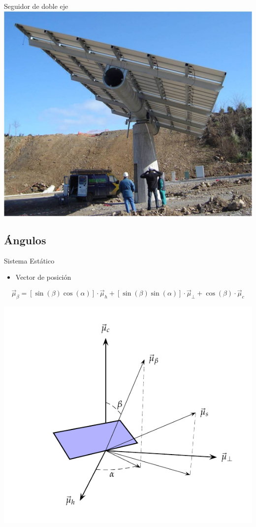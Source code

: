 \documentclass[xcolor={usenames,svgnames,dvipsnames}]{beamer}
\begin{document}
\begin{frame}[label=sec-2-1-5]{Seguidor de doble eje}
\includegraphics[width=.9\linewidth]{../figs/SeguidorReocin.jpg}
\end{frame}


\subsection{Ángulos}
\label{sec-2-2}

\begin{frame}[label=sec-2-2-1]{Sistema Estático}
\begin{itemize}
\item Vector de posición
\end{itemize}
\[\vec{\mu}_{\beta}=[\sin(\beta)\cos(\alpha)]\cdot\vec{\mu}_{h}+[\sin(\beta)\sin(\alpha)]\cdot\vec{\mu}_{\bot}+\cos(\beta)\cdot\vec{\mu}_{c}\]

\includegraphics[width=.9\linewidth]{../figs/AngulosSistemaEstatico.pdf}
\end{frame}
\end{document}
